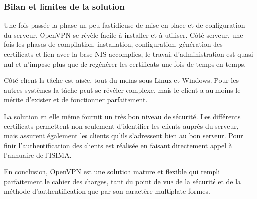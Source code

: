 \subsubsection{Bilan et limites de la solution}

Une fois passée la phase un peu fastidieuse de mise en place et de configuration du serveur, OpenVPN se révèle facile à installer et à utiliser. Côté serveur, une fois les phases de compilation, installation, configuration, génération des certificats et lien avec la base NIS accomplies, le travail d'administration est quasi nul et n'impose plus que de regénérer les certificats une fois de temps en temps.

Côté client la tâche est aisée, tout du moins sous Linux et Windows. Pour les autres systèmes la tâche peut se révéler complexe, mais le client a au moins le mérite d'exister et de fonctionner parfaitement.

La solution en elle même fournit un très bon niveau de sécurité. Les différents certificats permettent non seulement d'identifier les clients auprès du serveur, mais assurent également les clients qu'ils s'adressent bien au bon serveur. Pour finir l'authentification des clients est réalisée en faisant directement appel à l'annuaire de l'ISIMA.

En conclusion, OpenVPN est une solution mature et flexible qui rempli parfaitement le cahier des charges, tant du point de vue de la sécurité et de la méthode d'authentification que par son caractère multiplate-formes.


% 
